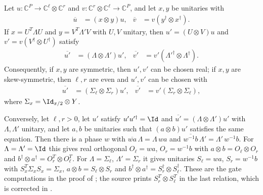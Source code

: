 \begin{lemma}
    \label{lem:mpu_conjugation_gate_gauge}
    \leanok
    Let $u:\mathbb C^P\to\mathbb C^\ell\otimes\mathbb C^r$ and
    $v:\mathbb C^r\otimes\mathbb C^\ell\to\mathbb C^P$, and let $x,y$ be
    unitaries with
    \begin{align}
        \overline u & =(x\otimes y)u, & \overline v & =v(y^\dagger\otimes x^\dagger).
    \end{align}
    If $x=U^T\Lambda U$ and $y=V^T\Lambda'V$ with $U,V$ unitary, then
    $u'=(U\otimes V)u$ and $v'=v(V^\dagger\otimes U^\dagger)$ satisfy
    \begin{align}
        \overline{u'} & =(\Lambda\otimes\Lambda')u',                 &
        \overline{v'} & =v'(\Lambda'^\dagger\otimes\Lambda^\dagger).
    \end{align}
    Consequently, if $x,y$ are symmetric, then $u',v'$ can be chosen real; if
    $x,y$ are skew-symmetric, then $\ell,r$ are even and $u',v'$ can be chosen
    with
    \begin{align}
        \overline{u'} & =(\Sigma_\ell\otimes\Sigma_r)u', &
        \overline{v'} & =v'(\Sigma_r\otimes\Sigma_\ell),
    \end{align}
    where $\Sigma_x=\Id_{x/2}\otimes Y$.

    Conversely, let $\ell,r>0$, let $u'$ satisfy $u'u'^\dagger=\Id$ and
    $\overline{u'}=(\Lambda\otimes\Lambda')u'$ with $\Lambda,\Lambda'$
    unitary, and let $a,b$ be unitaries such that $(a\otimes b)u'$ satisfies
    the same equation. Then there is a phase $w$ with
    $\overline{wa}\,\Lambda=\Lambda\,wa$ and
    $\overline{w^{-1}b}\,\Lambda'=\Lambda'\,w^{-1}b$. For $\Lambda=\Lambda'=\Id$
    this gives real orthogonal $O_\ell=wa$, $O_r=w^{-1}b$ with
    $a\otimes b=O_\ell\otimes O_r$ and
    $b^\dagger\otimes a^\dagger=O_r^T\otimes O_\ell^T$. For
    $\Lambda=\Sigma_\ell$, $\Lambda'=\Sigma_r$ it gives unitaries
    $S_\ell=wa$, $S_r=w^{-1}b$ with $S_x^T\Sigma_xS_x=\Sigma_x$,
    $a\otimes b=S_\ell\otimes S_r$ and
    $b^\dagger\otimes a^\dagger=S_r^\dagger\otimes S_\ell^\dagger$.
    These are the gate computations in the proof of
    \cite[Proposition~V.2]{Cirac2017MPU}; the source prints $S_r^T\otimes
        S_\ell^T$ in the last relation, which is corrected in
    \cite{gap:mpu_conjugation_symplectic_uniqueness_transpose}.
\end{lemma}

